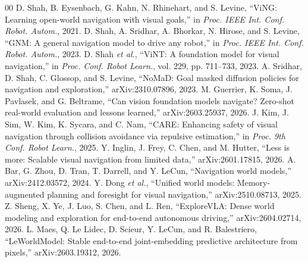 \documentclass[conference]{IEEEtran}
\begin{document}
\begin{thebibliography}{00}
 D. Shah, B. Eysenbach, G. Kahn, N. Rhinehart, and S. Levine, ``ViNG: Learning open-world navigation with visual goals,'' in \emph{Proc. IEEE Int. Conf. Robot. Autom.}, 2021.
 D. Shah, A. Sridhar, A. Bhorkar, N. Hirose, and S. Levine, ``GNM: A general navigation model to drive any robot,'' in \emph{Proc. IEEE Int. Conf. Robot. Autom.}, 2023.
 D. Shah \emph{et al.}, ``ViNT: A foundation model for visual navigation,'' in \emph{Proc. Conf. Robot Learn.}, vol. 229, pp. 711--733, 2023.
 A. Sridhar, D. Shah, C. Glossop, and S. Levine, ``NoMaD: Goal masked diffusion policies for navigation and exploration,'' arXiv:2310.07896, 2023.
 M. Guerrier, K. Soma, J. Pavlasek, and G. Beltrame, ``Can vision foundation models navigate? Zero-shot real-world evaluation and lessons learned,'' arXiv:2603.25937, 2026.
 J. Kim, J. Sim, W. Kim, K. Sycara, and C. Nam, ``CARE: Enhancing safety of visual navigation through collision avoidance via repulsive estimation,'' in \emph{Proc. 9th Conf. Robot Learn.}, 2025.
 Y. Inglin, J. Frey, C. Chen, and M. Hutter, ``Less is more: Scalable visual navigation from limited data,'' arXiv:2601.17815, 2026.
 A. Bar, G. Zhou, D. Tran, T. Darrell, and Y. LeCun, ``Navigation world models,'' arXiv:2412.03572, 2024.
 Y. Dong \emph{et al.}, ``Unified world models: Memory-augmented planning and foresight for visual navigation,'' arXiv:2510.08713, 2025.
 Z. Sheng, X. Ye, J. Luo, S. Chen, and L. Ren, ``ExploreVLA: Dense world modeling and exploration for end-to-end autonomous driving,'' arXiv:2604.02714, 2026.
 L. Maes, Q. Le Lidec, D. Scieur, Y. LeCun, and R. Balestriero, ``LeWorldModel: Stable end-to-end joint-embedding predictive architecture from pixels,'' arXiv:2603.19312, 2026.
\end{thebibliography}
\end{document}
